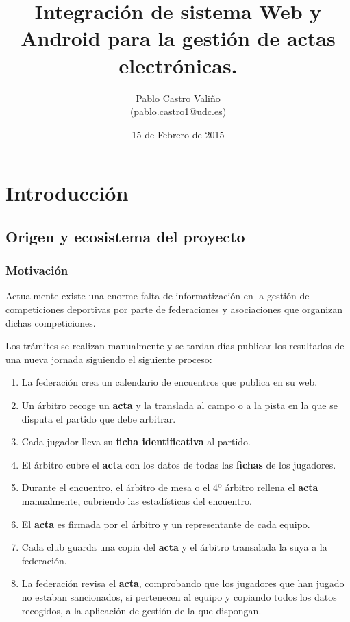 \documentclass[a4paper,spanish,10p,titlepage]{report}
\begin{document}
\title{\Huge{Integración de sistema Web y Android para la gestión de actas 
electrónicas.} \\ \small{}}
\author{Pablo Castro Valiño \\ \small{(pablo.castro1@udc.es)}
}

\date{15 de Febrero de 2015}

\renewcommand{\tablename}{Tabla}

\maketitle

\tableofcontents
\newpage


\chapter{Introducción}


\section{Origen y ecosistema del proyecto}
    
    \subsection{Motivación}
    Actualmente existe una enorme falta de informatización en la gestión de 
competiciones deportivas por parte de federaciones y asociaciones que organizan dichas 
competiciones.

Los trámites se realizan manualmente y se tardan días publicar los resultados de una 
nueva jornada siguiendo el siguiente proceso:
    \begin{enumerate}
     \item La federación crea un calendario de encuentros que publica en su web.
     \item Un árbitro recoge un \textbf{acta} y la translada al campo o a la pista en la 
que se disputa el partido que debe arbitrar.
     \item Cada jugador lleva su \textbf{ficha identificativa} al partido.
     \item El árbitro cubre el \textbf{acta} con los datos de todas las \textbf{fichas} 
de los jugadores.
     \item Durante el encuentro, el árbitro de mesa o el 4º árbitro rellena el 
\textbf{acta} manualmente, cubriendo las estadísticas del encuentro.
     \item El \textbf{acta} es firmada por el árbitro y un representante de cada equipo.
     \item Cada club guarda una copia del \textbf{acta} y el árbitro transalada la suya a 
la federación.
     \item La federación revisa el \textbf{acta}, comprobando que los jugadores que han 
jugado no estaban sancionados, si pertenecen al equipo y copiando todos los datos 
recogidos, a la aplicación de gestión de la que dispongan.
    \end{enumerate}
\end{document}
